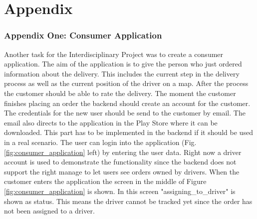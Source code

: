 \part*{Appendix}
\renewcommand{\thesection}{\arabic{section}}
\renewcommand{\theequation}{\arabic{equation}}
\section{Appendix One: Consumer Application}\label{section:Appendix One: Consumer Application}

Another task for the Interdisciplinary Project was to create a consumer application. The aim of the application is to give the person who just ordered information about the delivery. This includes the current step in the delivery process as well as the current position of the driver on a map. After the process the customer should be able to rate the delivery.\newline
The moment the customer finishes placing an order the backend should create an account for the customer. The credentials for the new user should be send to the customer by email. The email also directs to the application in the Play Store where it can be downloaded. This part has to be implemented in the backend if it should be used in a real scenario.\newline
The user can login into the application (Fig. \ref{fig:consumer_application} left) by entering the user data. Right now a driver account is used to demonstrate the functionality since the backend does not support the right manage to let users see orders owned by drivers.\newline
When the customer enters the application the screen in the middle of Figure \ref{fig:consumer_application} is shown. In this screen "assigning_to_driver" is shown as status. This means the driver cannot be tracked yet since the order has not been assigned to a driver.


